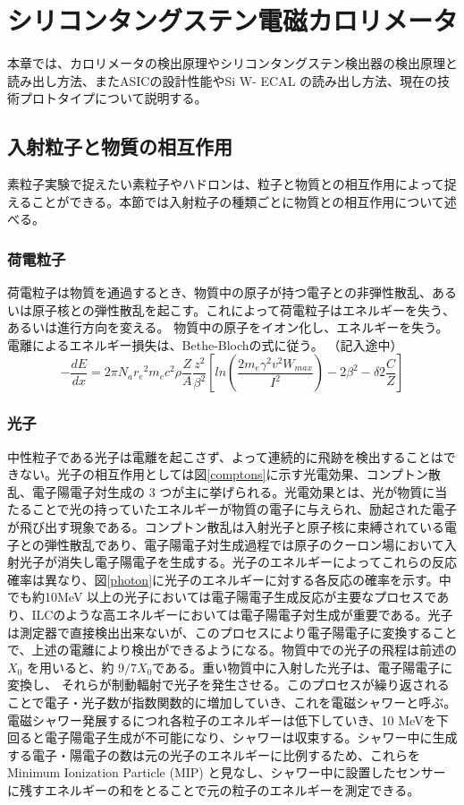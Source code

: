 
\chapter{シリコンタングステン電磁カロリメータ} \label{sec:1.Siwecal}
本章では、カロリメータの検出原理やシリコンタングステン検出器の検出原理と読み出し方法、またASICの設計性能やSi W- ECAL の読み出し方法、現在の技術プロトタイプについて説明する。
\section{入射粒子と物質の相互作用}
素粒子実験で捉えたい素粒子やハドロンは、粒子と物質との相互作用によって捉えることができる。本節では入射粒子の種類ごとに物質との相互作用について述べる。
\subsection{荷電粒子}
荷電粒子は物質を通過するとき、物質中の原子が持つ電子との非弾性散乱、あるいは原子核との弾性散乱を起こす。これによって荷電粒子はエネルギーを失う、あるいは進行方向を変える。
物質中の原子をイオン化し、エネルギーを失う。電離によるエネルギー損失は、Bethe-Blochの式に従う。
（記入途中）
\begin{equation}
-\frac{dE}{dx} = 2\pi N_a {r_e}^2m_ec^2\rho \frac{Z}{A} \frac{z^2}{{\beta}^2}[ln(\frac{2m_e{\gamma}^2v^2W_{max}}{I^2}) -2{\beta}^2 - \delta 2\frac{C}{Z} ]
\end{equation}

\subsection{光子}
中性粒子である光子は電離を起こさず、よって連続的に飛跡を検出することはできない。光子の相互作用としては図\ref{comptons}に示す光電効果、コンプトン散乱、電子陽電子対生成の 3 つが主に挙げられる。光電効果とは、光が物質に当たることで光の持っていたエネルギーが物質の電子に与えられ、励起された電子が飛び出す現象である。コンプトン散乱は入射光子と原子核に束縛されている電子との弾性散乱であり、電子陽電子対生成過程では原子のクーロン場において入射光子が消失し電子陽電子を生成する。光子のエネルギーによってこれらの反応確率は異なり、図\ref{photon}に光子のエネルギーに対する各反応の確率を示す。中でも約10MeV 以上の光子においては電子陽電子生成反応が主要なプロセスであり、ILCのような高エネルギーにおいては電子陽電子対生成が重要である。光子は測定器で直接検出出来ないが、このプロセスにより電子陽電子に変換することで、上述の電離により検出ができるようになる。物質中での光子の飛程は前述の $X_0$ を用いると、約 $9/7 X_0 $である。重い物質中に入射した光子は、電子陽電子に変換し、 それらが制動輻射で光子を発生させる。このプロセスが繰り返されることで電子・光子数が指数関数的に増加していき、これを電磁シャワーと呼ぶ。電磁シャワー発展するにつれ各粒子のエネルギーは低下していき、10 MeVを下回ると電子陽電子生成が不可能になり、シャワーは収束する。シャワー中に生成する電子・陽電子の数は元の光子のエネルギーに比例するため、これらをMinimum Ionization Particle (MIP) と見なし、シャワー中に設置したセンサーに残すエネルギーの和をとることで元の粒子のエネルギーを測定できる。
